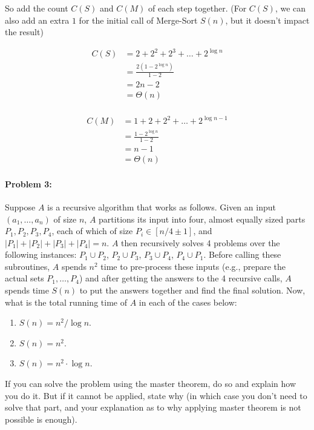 \documentclass{article}
\begin{document}
So add the count $C(S)$ and $C(M)$ of each step together. (For $C(S)$, we can also add an extra $1$ for the initial call of Merge-Sort $S(n)$, but it doesn't impact the result)

$$\begin{aligned}
C(S)&=2+2^2+2^3+\dots+2^{\log n}\\
&=\frac{2(1-2^{\log n})}{1-2}\\
&=2n-2\\
&=\Theta(n)\\
\end{aligned}$$

$$\begin{aligned}
C(M)&=1+2+2^2+\dots+2^{{\log n}-1}\\
&=\frac{1-2^{\log n}}{1-2}\\
&=n-1\\
&=\Theta(n)
\end{aligned}$$



\newpage
\paragraph{Problem 3:} 
Suppose $A$ is a recursive algorithm that works as follows. Given an input $(a_1,\dots,a_n)$ of size $n$, $A$ partitions its input into four, almost equally sized parts $P_1,P_2,P_3,P_4$, each of which of size $P_i \in [n/4 \pm 1]$, and $|P_1|+|P_2|+|P_3|+|P_4| = n$. $A$ then recursively solves 4 problems over the following instances: $P_1 \cup P_2$, $P_2 \cup P_3$, $P_3 \cup P_4$, $P_4 \cup P_1$. Before calling these subroutines, $A$ spends $n^2$ time to pre-process these inputs (e.g., prepare the actual sets $P_1,\dots,P_4$) and after getting the answers to the 4 recursive calls, $A$ spends time $S(n)$ to put the answers together and find the final solution. Now, what is the total running time of $A$ in each of the cases below:
\begin{enumerate}
    \item $S(n) = n^2/ \log n$.
    \item $S(n) = n^2$.
    \item $S(n) = n^2 \cdot \log n$.
\end{enumerate}
If you can solve the problem using the master theorem, do so and explain how you do it. But if it cannot be applied, state why (in which case you don't need to solve that part, and your explanation as to why applying master theorem is not possible is enough).
\end{document}
